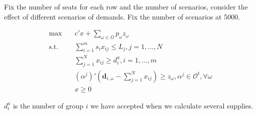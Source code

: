 Fix the number of seats for each row and the number of scenarios, consider the effect of different scenarios of demands. Fix the number of scenarios at 5000.



\begin{equation}\label{BD_demands}
  \begin{aligned}
    \max \quad & c{'} x + \sum_{\omega \in \Omega} p_{\omega} z_{\omega} \\
    \text {s.t.} \quad & \sum_{i = 1}^{m} s_i x_{ij} \leq L_{j}, j=1,\ldots,N \\
    & \sum_{j =1}^{N} x_{ij} \geq d_{i}^{a}, i=1,\ldots,m \\
    & (\alpha^{j}){'}(\mathbf{d}_{i,\omega}- \sum_{j=1}^{N} x_{ij}) \geq z_{\omega}, \alpha^j \in \mathcal{O}^{t}, \forall \omega \\
     & x \geq 0
  \end{aligned}
\end{equation}

$d_{i}^{a}$ is the number of group $i$ we have accepted when we calculate several supplies.


